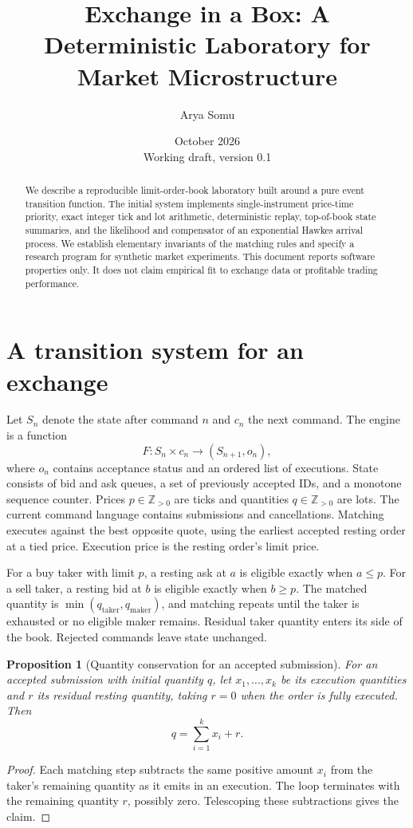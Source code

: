 \documentclass[11pt]{article}
\title{Exchange in a Box: A Deterministic Laboratory for Market Microstructure}
\author{Arya Somu}
\date{October 2026\\Working draft, version 0.1}
\newtheorem{proposition}{Proposition}
\begin{document}
\maketitle
\begin{abstract}
We describe a reproducible limit-order-book laboratory built around a pure event transition function. The initial system implements single-instrument price-time priority, exact integer tick and lot arithmetic, deterministic replay, top-of-book state summaries, and the likelihood and compensator of an exponential Hawkes arrival process. We establish elementary invariants of the matching rules and specify a research program for synthetic market experiments. This document reports software properties only. It does not claim empirical fit to exchange data or profitable trading performance.
\end{abstract}

\section{A transition system for an exchange}
Let $S_n$ denote the state after command $n$ and $c_n$ the next command. The engine is a function
\begin{equation}
  F:S_n\times c_n\longrightarrow (S_{n+1},o_n),
\end{equation}
where $o_n$ contains acceptance status and an ordered list of executions. State consists of bid and ask queues, a set of previously accepted IDs, and a monotone sequence counter. Prices $p\in\mathbb{Z}_{>0}$ are ticks and quantities $q\in\mathbb{Z}_{>0}$ are lots. The current command language contains submissions and cancellations. Matching executes against the best opposite quote, using the earliest accepted resting order at a tied price. Execution price is the resting order's limit price.

For a buy taker with limit $p$, a resting ask at $a$ is eligible exactly when $a\le p$. For a sell taker, a resting bid at $b$ is eligible exactly when $b\ge p$. The matched quantity is $\min(q_{\mathrm{taker}},q_{\mathrm{maker}})$, and matching repeats until the taker is exhausted or no eligible maker remains. Residual taker quantity enters its side of the book. Rejected commands leave state unchanged.

\begin{proposition}[Quantity conservation for an accepted submission]
For an accepted submission with initial quantity $q$, let $x_1,\ldots,x_k$ be its execution quantities and $r$ its residual resting quantity, taking $r=0$ when the order is fully executed. Then
\begin{equation}
q=\sum_{i=1}^{k}x_i+r.
\end{equation}
\end{proposition}
\begin{proof}
Each matching step subtracts the same positive amount $x_i$ from the taker's remaining quantity as it emits in an execution. The loop terminates with the remaining quantity $r$, possibly zero. Telescoping these subtractions gives the claim.
\end{proof}
\end{document}
